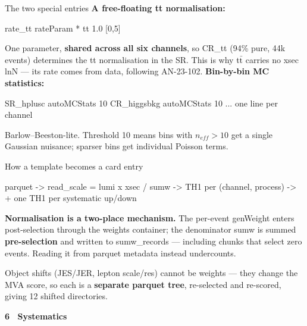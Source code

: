 \documentclass[aspectratio=169,10pt]{beamer}
\newcommand{\code}[1]{{\ttfamily\small\colorbox{codebg}{#1}}}
\newcommand{\sectionframe}[2][]{%
  \begingroup
  \setbeamercolor{background canvas}{bg=deckblue}
  \begin{frame}[plain]
    \vfill
    \begin{center}
      {\Large\bfseries\color{white} #2}\\[0.4em]
      \colorbox{deckgold}{\makebox[0.35\textwidth]{\rule{0pt}{1.2pt}}}
      \ifx\relax#1\relax\else\\[0.6em]{\color{white!80!deckblue}\small #1}\fi
    \end{center}
    \vfill
  \end{frame}
  \endgroup
}
\begin{document}
\begin{frame}[fragile]{The two special entries}
\textbf{A free-floating tt normalisation:}
\begin{semiverbatim}\small
rate_tt  rateParam  *  tt  1.0  [0,5]
\end{semiverbatim}
{\small One parameter, \textbf{shared across all six channels}, so CR\_tt (94\% pure,
44k events) determines the tt normalisation in the SR. This is why
t$\bar{\text{t}}$ carries no \code{xsec} lnN --- its rate comes from data, following
AN-23-102.}
\vspace{0.4em}
\textbf{Bin-by-bin MC statistics:}
\begin{semiverbatim}\small
SR_hplusc    autoMCStats 10
CR_higgsbkg  autoMCStats 10
   ... one line per channel
\end{semiverbatim}
{\small Barlow--Beeston-lite. Threshold 10 means bins with $n_{eff} > 10$ get a
single Gaussian nuisance; sparser bins get individual Poisson terms.}
\end{frame}

\begin{frame}[fragile]{How a template becomes a card entry}
\begin{semiverbatim}\small
parquet  ->  read_scale = lumi x xsec / sumw  ->  TH1 per (channel, process)
                                              ->  + one TH1 per systematic up/down
\end{semiverbatim}
\vspace{0.3em}
\begin{keybox}
\textbf{Normalisation is a two-place mechanism.} The per-event \code{genWeight}
enters post-selection through the weights container; the denominator \code{sumw} is
summed \textbf{pre-selection} and written to \code{sumw\_records} --- including
chunks that select zero events. Reading it from parquet metadata instead undercounts.
\end{keybox}
\vspace{0.2em}
{\small Object shifts (JES/JER, lepton scale/res) cannot be weights --- they change
the MVA score, so each is a \textbf{separate parquet tree}, re-selected and
re-scored, giving 12 shifted directories.}
\end{frame}

\sectionframe{6 \textperiodcentered\ Systematics}
\end{document}

